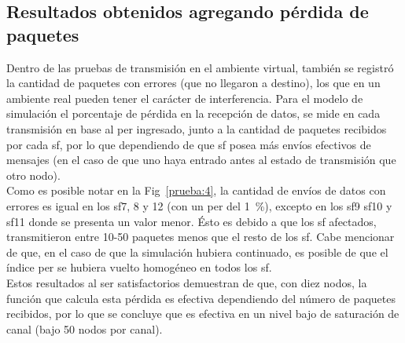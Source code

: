 \begin{justify}
\subsection{Resultados obtenidos agregando pérdida de paquetes}
Dentro de las pruebas de transmisión en el ambiente virtual, también se registró la cantidad de paquetes con errores (que no llegaron a destino), los que en un ambiente real pueden tener el carácter de interferencia. Para el modelo de simulación el porcentaje de pérdida en la recepción de datos, se mide en cada transmisión en base al \gls{per} ingresado, junto a la cantidad de paquetes recibidos por cada \gls{sf}, por lo que dependiendo de que \gls{sf} posea más envíos efectivos de mensajes (en el caso de que uno haya entrado antes al estado de transmisión que otro nodo).\\
Como es posible notar en la Fig~\ref{prueba:4}, la cantidad de envíos de datos con errores es igual en los \gls{sf}7, 8 y 12 (con un \gls{per} del \SI{1}{\percent}), excepto en los \gls{sf}9 \gls{sf}10 y \gls{sf}11 donde se presenta un valor menor. Ésto es debido a que los \gls{sf} afectados, transmitieron entre 10-50 paquetes menos que el resto de los \gls{sf}. Cabe mencionar de que, en el caso de que la simulación hubiera continuado, es posible de que el índice \gls{per} se hubiera vuelto homogéneo en todos los \gls{sf}.\\
Estos resultados al ser satisfactorios demuestran de que, con diez nodos, la función que calcula esta pérdida es efectiva dependiendo del número de paquetes recibidos, por lo que se concluye que es efectiva en un nivel bajo de saturación de canal (bajo 50 nodos por canal).
\begin{figure}[!ht]
\centering

\end{figure}
\end{justify}
